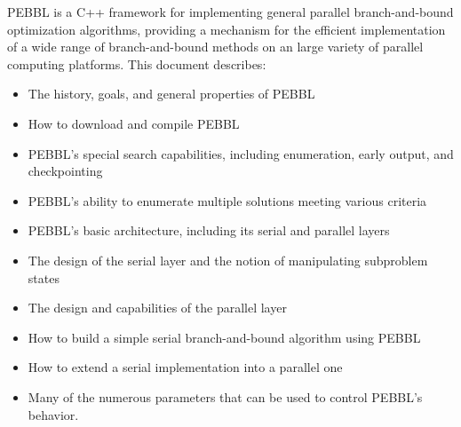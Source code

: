 PEBBL is a C++ framework for implementing general parallel
branch-and-bound optimization algorithms, providing a mechanism for
the efficient implementation of a wide range of branch-and-bound
methods on an large variety of parallel computing platforms.
This document describes:
\begin{itemize}
\item The history, goals, and general properties of PEBBL
\item How to download and compile PEBBL
\item PEBBL's special search capabilities, including enumeration,
  early output, and checkpointing
\item PEBBL's ability to enumerate multiple solutions meeting various criteria
\item PEBBL's basic architecture, including its serial and parallel layers
\item The design of the serial layer and the notion of manipulating
  subproblem states
\item The design and capabilities of the parallel layer
\item How to build a simple serial branch-and-bound algorithm using
  PEBBL
\item How to extend a serial implementation into a parallel one
\item Many of the numerous parameters that can be used to 
control PEBBL's behavior.
\end{itemize}
